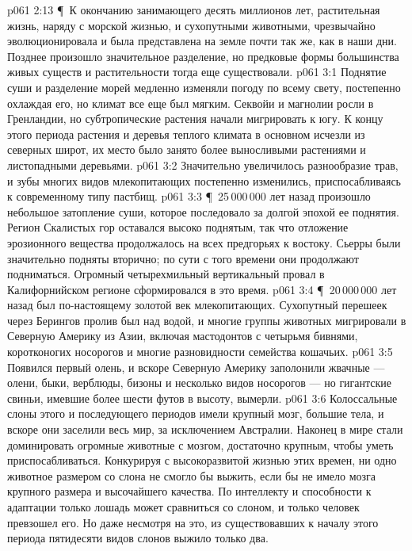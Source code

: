 \vs p061 2:13 \P\ К окончанию  занимающего десять миллионов лет, растительная жизнь, наряду с морской жизнью, и сухопутными животными, чрезвычайно эволюционировала и была представлена на земле почти так же, как в наши дни. Позднее произошло значительное разделение, но предковые формы большинства живых существ и растительности тогда еще существовали.
\vs p061 3:1 Поднятие суши и разделение морей медленно изменяли погоду по всему свету, постепенно охлаждая его, но климат все еще был мягким. Секвойи и магнолии росли в Гренландии, но субтропические растения начали мигрировать к югу. К концу этого периода растения и деревья теплого климата в основном исчезли из северных широт, их место было занято более выносливыми растениями и листопадными деревьями.
\vs p061 3:2 Значительно увеличилось разнообразие трав, и зубы многих видов млекопитающих постепенно изменились, приспосабливаясь к современному типу пастбищ.
\vs p061 3:3 \P\ 25\,000\,000 лет назад произошло небольшое затопление суши, которое последовало за долгой эпохой ее поднятия. Регион Скалистых гор оставался высоко поднятым, так что отложение эрозионного вещества продолжалось на всех предгорьях к востоку. Сьерры были значительно подняты вторично; по сути с того времени они продолжают подниматься. Огромный четырехмильный вертикальный провал в Калифорнийском регионе сформировался в это время.
\vs p061 3:4 \P\ 20\,000\,000 лет назад был по\hyp{}настоящему золотой век млекопитающих. Сухопутный перешеек через Берингов пролив был над водой, и многие группы животных мигрировали в Северную Америку из Азии, включая мастодонтов с четырьмя бивнями, коротконогих носорогов и многие разновидности семейства кошачьих.
\vs p061 3:5 Появился первый олень, и вскоре Северную Америку заполонили жвачные --- олени, быки, верблюды, бизоны и несколько видов носорогов --- но гигантские свиньи, имевшие более шести футов в высоту, вымерли.
\vs p061 3:6 Колоссальные слоны этого и последующего периодов имели крупный мозг, большие тела, и вскоре они заселили весь мир, за исключением Австралии. Наконец в мире стали доминировать огромные животные с мозгом, достаточно крупным, чтобы уметь приспосабливаться. Конкурируя с высокоразвитой жизнью этих времен, ни одно животное размером со слона не смогло бы выжить, если бы не имело мозга крупного размера и высочайшего качества. По интеллекту и способности к адаптации только лошадь может сравниться со слоном, и только человек превзошел его. Но даже несмотря на это, из существовавших к началу этого периода пятидесяти видов слонов выжило только два.
